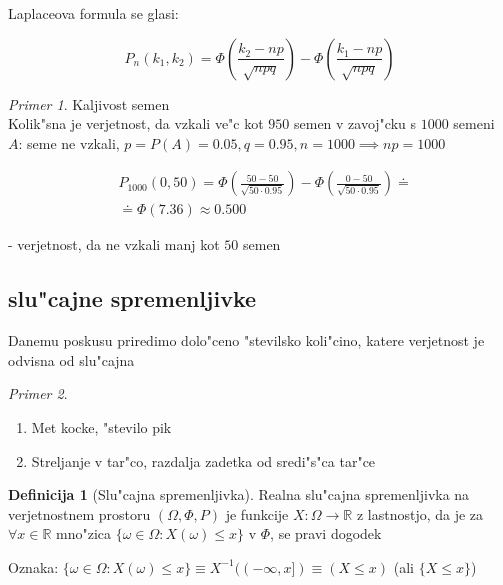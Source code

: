 \documentclass[a4paper,12pt]{article}
\theoremstyle{definition}
\newtheorem{defn}[counter]{Definicija}
\theoremstyle{remark}
\newtheorem*{ex}{Primer}
\newcommand{\R}{\mathbb{R}}
\begin{document}
Laplaceova formula se glasi:

\begin{equation*}
    P_n(k_1, k_2) = \Phi(\frac{k_2 - np}{\sqrt{npq}}) - \Phi(\frac{k_1 - np}{\sqrt{npq}})
\end{equation*}

\begin{ex}
    Kaljivost semen \\
    Kolik"sna je verjetnost, da vzkali ve"c kot $950$ semen v zavoj"cku s $1000$ semeni \\
    $A$: seme ne vzkali, $p = P(A) = 0.05, q = 0.95, n = 1000 \implies np = 1000$

    \begin{align*}
        &P_{1000}(0,50) = \Phi(\frac{50-50}{\sqrt{50 \cdot 0.95}}) - \Phi(\frac{0-50}{\sqrt{50 \cdot 0.95}}) \doteq \\
        &\doteq \Phi(7.36) \approx 0.500
    \end{align*}

    - verjetnost, da ne vzkali manj kot $50$ semen
\end{ex}

\subsection{slu"cajne spremenljivke}

Danemu poskusu priredimo dolo"ceno "stevilsko koli"cino, katere verjetnost je odvisna od slu"cajna

\begin{ex} \text{} \\
    \begin{enumerate}
        \item Met kocke, "stevilo pik
        \item Streljanje v tar"co, razdalja zadetka od sredi"s"ca tar"ce
    \end{enumerate}
\end{ex}

\begin{defn}[Slu"cajna spremenljivka]
    Realna slu"cajna spremenljivka na verjetnostnem prostoru $(\Omega, \Phi, P)$ je funkcije $X: \Omega \to \R$ z
    lastnostjo, da je za $\forall x \in \R$ mno"zica $\{\omega \in \Omega: X(\omega) \leq x\}$ v $\Phi$, se pravi dogodek
\end{defn}

Oznaka: $\{\omega \in \Omega: X(\omega) \leq x\} \equiv X^{-1}((-\infty, x]) \equiv (X \leq x)$ (ali $\{X \leq x\}$)
\end{document}
